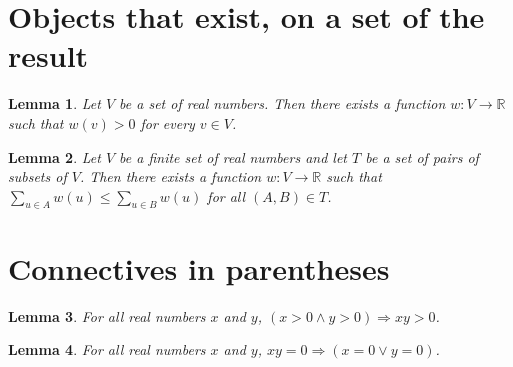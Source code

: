 \documentclass{article}
\newtheorem{lemma}{Lemma}
\begin{document}
\section{Objects that exist, on a set of the result}

\begin{lemma}\label{positive}
Let $V$ be a set of real numbers. Then there exists a function $w\colon V\to\mathbb{R}$ such that $w(v)>0$ for every $v\in V$.
\end{lemma}

\begin{lemma}\label{decider}
Let $V$ be a finite set of real numbers and let $T$ be a set of pairs of subsets of $V$. Then there exists a function $w\colon V\to\mathbb{R}$ such that $\sum_{u\in A}w(u)\le\sum_{u\in B}w(u)$ for all $(A,B)\in T$.
\end{lemma}

\section{Connectives in parentheses}

\begin{lemma}\label{grouped}
For all real numbers $x$ and $y$, $(x>0\land y>0)\Rightarrow xy>0$.
\end{lemma}

\begin{lemma}\label{either}
For all real numbers $x$ and $y$, $xy=0\Rightarrow(x=0\lor y=0)$.
\end{lemma}
\end{document}
